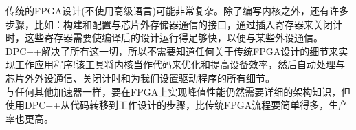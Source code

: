 \begin{tcolorbox}[colback=blue!5!white,colframe=blue!75!black, title=在FPGA上使用DPC++其实要经历很多!]
传统的FPGA设计(不使用高级语言)可能非常复杂。除了编写内核之外，还有许多步骤，比如：构建和配置与芯片外存储器通信的接口，通过插入寄存器来关闭计时，这些寄存器需要使编译后的设计运行得足够快，以便与某些外设通信。DPC++解决了所有这一切，所以不需要知道任何关于传统FPGA设计的细节来实现工作应用程序!该工具将内核当作代码来优化和提高设备效率，然后自动处理与芯片外外设通信、关闭计时和为我们设置驱动程序的所有细节。\\

与任何其他加速器一样，要在FPGA上实现峰值性能仍然需要详细的架构知识，但使用DPC++从代码转移到工作设计的步骤，比传统FPGA流程要简单得多，生产率也更高。
\end{tcolorbox}



















